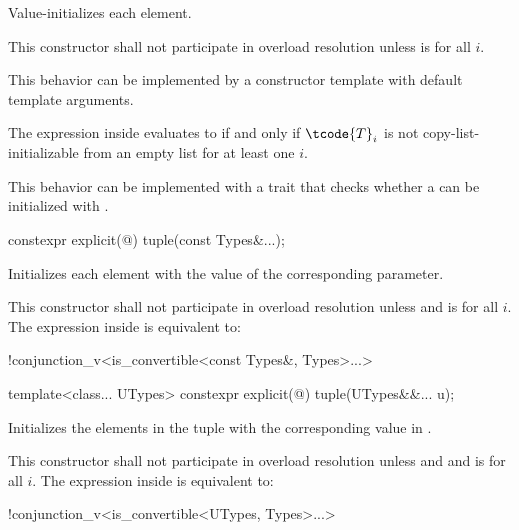 \begin{itemdescr}
\pnum
\effects
Value-initializes each element.

\pnum
\remarks
This constructor shall not participate in overload resolution unless
 is  for all $i$.
\begin{note}
This behavior can be implemented by a constructor template
with default template arguments.
\end{note}
The expression inside  evaluates to 
if and only if $\tcode{T}_i$ is not
copy-list-initializable from an empty list
for at least one $i$.
\begin{note}
This behavior can be implemented with a trait that checks whether
a  can be initialized with \tcode{\{\}}.
\end{note}
\end{itemdescr}

%
\begin{itemdecl}
constexpr explicit(@\seebelow@) tuple(const Types&...);
\end{itemdecl}

\begin{itemdescr}
\pnum
\effects
Initializes each element with the value of the
corresponding parameter.

\pnum
\remarks
This constructor shall not participate in overload resolution unless
 and 
is  for all $i$.
The expression inside  is equivalent to:
\begin{codeblock}
!conjunction_v<is_convertible<const Types&, Types>...>
\end{codeblock}
\end{itemdescr}

%
\begin{itemdecl}
template<class... UTypes> constexpr explicit(@\seebelow@) tuple(UTypes&&... u);
\end{itemdecl}

\begin{itemdescr}
\pnum
\effects
Initializes the elements in the tuple with the
corresponding value in .

\pnum
\remarks
This constructor shall not participate in overload resolution unless
 \tcode{==}  and
 and 
is  for all $i$.
The expression inside  is equivalent to:
\begin{codeblock}
!conjunction_v<is_convertible<UTypes, Types>...>
\end{codeblock}
\end{itemdescr}

